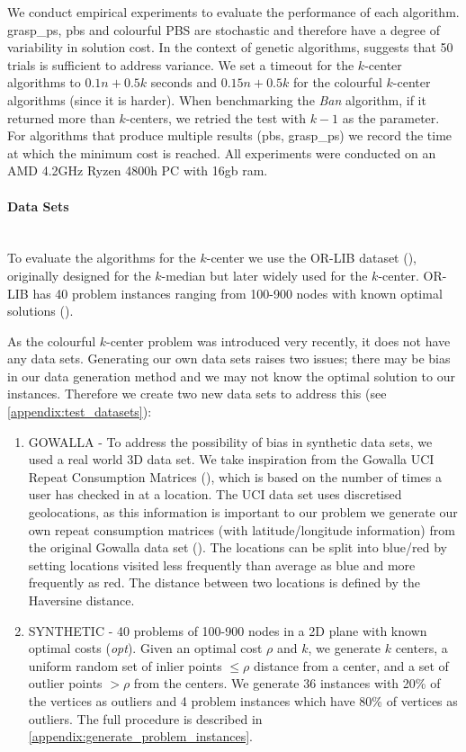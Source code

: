 We conduct empirical experiments to evaluate the performance of each algorithm. \acrshort{grasp_ps}, \acrshort{pbs} and colourful PBS are stochastic and therefore have a degree of variability in solution cost. In the context of genetic algorithms, \textcite{kramer_genetic_2017} suggests that 50 trials is sufficient to address variance. We set a timeout for the $k$-center algorithms to $0.1n + 0.5k$ seconds and $0.15n + 0.5k$ for the colourful $k$-center algorithms (since it is harder). When benchmarking the \emph{Ban} algorithm, if it returned more than $k$-centers, we retried the test with $k-1$ as the parameter. For algorithms that produce multiple results (\acrshort{pbs}, \acrshort{grasp_ps}) we record the time at which the minimum cost is reached. All experiments were conducted on an AMD 4.2GHz Ryzen 4800h PC with 16gb ram. 

\paragraph{Data Sets}~\\
To evaluate the algorithms for the $k$-center we use the OR-LIB dataset (\cite{beasley_note_1985}), originally designed for the $k$-median but later widely used for the $k$-center. OR-LIB has 40 problem instances ranging from 100-900 nodes with known optimal solutions (\cite{pullan_memetic_2008}). 

As the colourful $k$-center problem was introduced very recently, it does not have any data sets. Generating our own data sets raises two issues; there may be bias in our data generation method and we may not know the optimal solution to our instances. Therefore we create two new data sets to address this (see \cref{appendix:test_datasets}):
\begin{enumerate}
    \item GOWALLA - To address the possibility of bias in synthetic data sets, we used a real world 3D data set. We take inspiration from the Gowalla UCI Repeat Consumption Matrices (\cite{kotzias_predicting_2019}), which is based on the number of times a user has checked in at a location. The UCI data set uses discretised geolocations, as this information is important to our problem we generate our own repeat consumption matrices (with latitude/longitude information) from the original Gowalla data set (\cite{cho_friendship_2011}). The locations can be split into blue/red by setting locations visited less frequently than average as blue and more frequently as red. The distance between two locations is defined by the Haversine distance. 
    \item SYNTHETIC - 40 problems of 100-900 nodes in a 2D plane with known optimal costs (\emph{opt}). Given an optimal cost $\rho$ and $k$, we generate $k$ centers, a uniform random set of inlier points $\leq\rho$ distance from a center, and a set of outlier points $>\rho$ from the centers. We generate 36 instances with 20\% of the vertices as outliers and 4 problem instances which have 80\% of vertices as outliers. The full procedure is described in \cref{appendix:generate_problem_instances}.
\end{enumerate}

